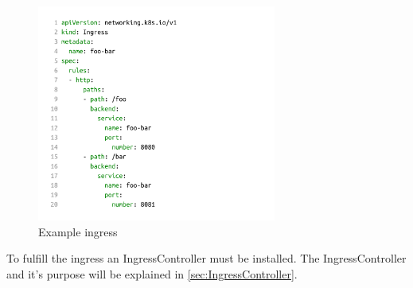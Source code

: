 \begin{figure}[H]
    \centering
    \includegraphics[width=0.7\textwidth, left]{media/02/ingress}
    \caption{Example ingress}
    \label{fig:ingress}
\end{figure}

To fulfill the ingress an IngressController must be installed.
The IngressController and it's purpose will be explained in \autoref{sec:IngressController}.
